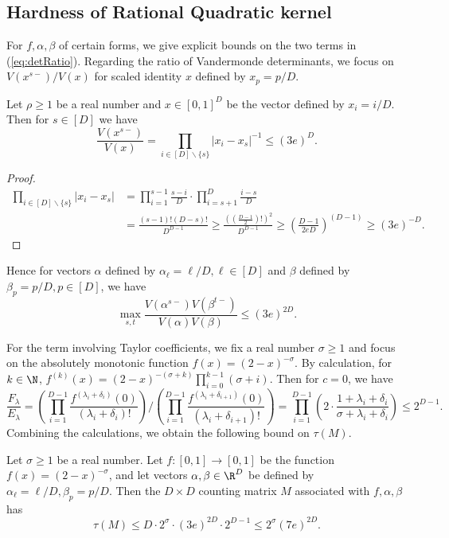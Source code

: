 \subsection{Hardness of Rational Quadratic kernel}
For $f, \alpha, \beta$ of certain forms, we give explicit bounds on the two terms in (\ref{eq:detRatio}). Regarding the ratio of Vandermonde determinants, we focus on $V(x^{s-})/V(x)$ for scaled identity $x$ defined by $x_p = p/D$.
\begin{proposition}
Let $\rho \ge 1$ be a real number and $x \in [0, 1]^D$ be the vector defined by $x_i = i/D$.
Then for $s \in [D]$ we have \[\frac{V(x^{s-})}{V(x)} = \prod_{i\in [D]\backslash \{s\}}|x_i - x_s|^{-1}
\le (3e)^{D}.\]
\end{proposition}
\begin{proof}
\begin{align*}
\prod_{i\in [D]\backslash \{s\}}|x_i - x_s| 
&=\prod_{i=1}^{s-1} \frac{s - i}{D}
\cdot \prod_{i=s+1}^D \frac{i - s}{D} \\
&= \frac{(s-1)!(D-s)!}{D^{D-1}}
\ge \frac{((\frac{D-1}2)!)^2}{D^{D-1}}
\ge \left(\frac{D-1}{2eD}\right)^{(D-1)}
\ge (3e)^{-D}.
\end{align*}
\end{proof}
Hence for vectors $\alpha$ defined by $\alpha_\ell = \ell/D, \ell\in [D]$ and $\beta$ defined by $\beta_p = p/D, p \in [D]$, we have
\[\max_{s, t} \frac{V(\alpha^{s-})V(\beta^{t-})}{V(\alpha)V(\beta)} \le (3e)^{2D}.\]

For the term involving Taylor coefficients, we fix a real number $\sigma \ge 1$ and focus on the absolutely monotonic function $f(x) = (2-x)^{-\sigma}$. By calculation, for $k \in \N$,
$f^{(k)}(x) = (2-x)^{-(\sigma + k)} \prod_{i=0}^{k-1}(\sigma + i)$.
Then for $c = 0$, we have
\[\frac{F_{\lambda}}{E_{\lambda}}
=\left(\prod_{i=1}^{D-1} 
\frac{f^{(\lambda_i + \delta_i)}(0)}{(\lambda_i + \delta_i)!}\right)
\bigg/\left(\prod_{i=1}^{D-1} 
\frac{f^{(\lambda_i + \delta_{i+1})}(0)}{(\lambda_i + \delta_{i+1})!}\right)
=\prod_{i=1}^{D-1}\left(2 \cdot \frac{1 + \lambda_i + \delta_i}{\sigma + \lambda_i + \delta_i}\right)
\le 2^{D-1}.\]
Combining the calculations, we obtain the following bound on $\tau(M)$.
\begin{theorem}
Let $\sigma \ge 1$ be a real number. 
Let $f:[0, 1] \rightarrow [0, 1]$ be the function $f(x) = (2-x)^{-\sigma}$, and let vectors $\alpha, \beta \in \R^D$ be defined by $\alpha_\ell = \ell/D, \beta_p = p/D$. Then the $D \times D$ counting matrix $M$ associated with $f, \alpha, \beta$ has
\[\tau(M) \le D \cdot 2^\sigma \cdot (3e)^{2D} \cdot 2^{D-1} \le 2^{\sigma}(7e)^{2D}.\]
\end{theorem}

